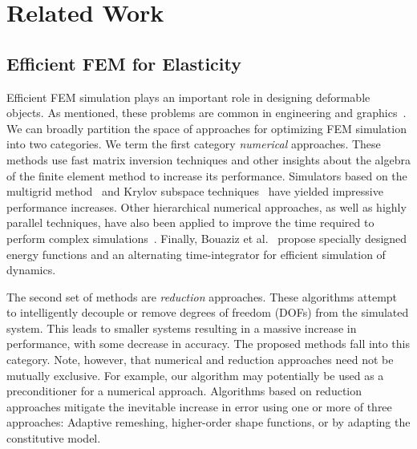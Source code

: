 \section{Related Work}
\subsection{Efficient FEM for Elasticity}
Efficient FEM simulation plays an important role in designing deformable objects.
As mentioned, these problems are common in engineering and
graphics~\cite{bendsoe2004topology,Bickel2010,Kou2012,Skouras2013,Chen2013,Xu2014}.
We can broadly partition the space of approaches for optimizing FEM simulation into two categories.
We term the first category \emph{numerical} approaches.
These methods use fast matrix inversion techniques and other insights about the algebra of the finite element method to increase its performance.
Simulators based on the multigrid method~\cite{Peraire1992,Zhu2010,McAdams2011} and Krylov subspace techniques~\cite{Patterson2012} have yielded impressive performance increases.
Other hierarchical numerical approaches, as well as highly parallel techniques, have also been applied to improve the time required to perform complex simulations~\cite{Farhat1991,Mandel1993}.
Finally, Bouaziz et al.~\cite{Bouaziz:2014} propose specially designed energy functions and an alternating time-integrator for efficient simulation of dynamics.

The second set of methods are \emph{reduction} approaches.
These algorithms attempt to intelligently decouple or remove degrees of freedom (DOFs) from the simulated system.
This leads to smaller systems resulting in a massive increase in performance, with some decrease in accuracy.
The proposed methods fall into this category.
Note, however, that numerical and reduction approaches need not be mutually exclusive.
For example, our algorithm may potentially be used as a preconditioner for a numerical approach. Algorithms based on reduction approaches mitigate the inevitable increase in error using one or more of three approaches: Adaptive remeshing, higher-order shape functions, or by adapting the constitutive model.

